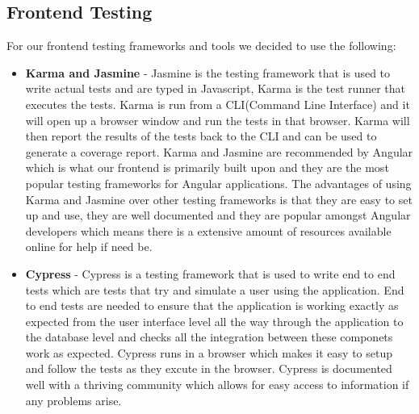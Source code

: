 \documentclass[12pt]{article}
\begin{document}
\subsection{Frontend Testing}
For our frontend testing frameworks and tools we decided to use the following:
\begin{itemize}
    \item \textbf{Karma and Jasmine} - Jasmine is the testing framework that is used to write actual tests and are typed in Javascript, Karma is the test runner that executes the tests. Karma is run from a CLI(Command Line Interface) and it will open up a browser window and run the tests in that browser. Karma will then report the results of the tests back to the CLI and can be used to generate a coverage report. Karma and Jasmine are recommended by Angular which is what our frontend is primarily built upon and they are the most popular testing frameworks for Angular applications. The advantages of using Karma and Jasmine over other testing frameworks is that they are easy to set up and use, they are well documented and they are popular amongst Angular developers which means there is a extensive amount of resources available online for help if need be.
    \item \textbf{Cypress} - Cypress is a testing framework that is used to write end to end tests which are tests that try and simulate a user using the application. End to end tests are needed to ensure that the application is working exactly as expected from the user interface level all the way through the application to the database level and checks all the integration between these componets work as expected. Cypress runs in a browser which makes it easy to setup and follow the tests as they excute in the browser. Cypress is documented well with a thriving community which allows for easy access to information if any problems arise.
\end{itemize}
\end{document}
